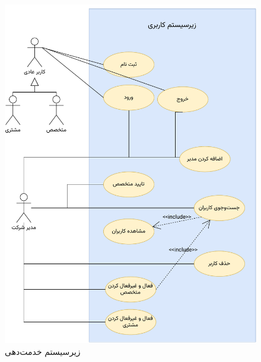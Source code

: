 \begin{figure}
\centering
	\includegraphics[scale=0.8, page=2]{figs/usecase.pdf}
\caption{زیرسیستم خدمت‌دهی}
\end{figure}
\FloatBarrier
\newpage

